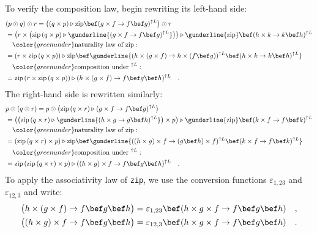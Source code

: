 To verify the composition law, begin rewriting its left-hand side:
\begin{align*}
 & (p\odot q)\odot r=\big((q\times p)\triangleright\text{zip}\bef(g\times f\rightarrow f\bef g)^{\uparrow L}\big)\odot r\\
 & =\big(r\times\big(\text{zip}\left(q\times p\right)\triangleright\gunderline{(g\times f\rightarrow f\bef g)^{\uparrow L}}\big)\big)\triangleright\gunderline{\text{zip}}\bef(h\times k\rightarrow k\bef h)^{\uparrow L}\\
 & \quad{\color{greenunder}\text{naturality law of }\text{zip}:}\quad\\
 & =(r\times\text{zip}\left(q\times p\right))\triangleright\text{zip}\bef\gunderline{(h\times(g\times f)\rightarrow h\times(f\bef g))^{\uparrow L}\bef(h\times k\rightarrow k\bef h)^{\uparrow L}}\\
 & \quad{\color{greenunder}\text{composition under }^{\uparrow L}:}\quad\\
 & =\text{zip}\left(r\times\text{zip}\left(q\times p\right)\right)\triangleright(h\times(g\times f)\rightarrow f\bef g\bef h)^{\uparrow L}\quad.
\end{align*}
The right-hand side is rewritten similarly:
\begin{align*}
 & p\odot(q\odot r)=p\odot\big(\text{zip}\left(q\times r\right)\triangleright(g\times f\rightarrow f\bef g)^{\uparrow L}\big)\\
 & =\big(\big(\text{zip}\left(q\times r\right)\triangleright\gunderline{(h\times g\rightarrow g\bef h)^{\uparrow L}}\big)\times p\big)\triangleright\gunderline{\text{zip}}\bef(k\times f\rightarrow f\bef k)^{\uparrow L}\\
 & \quad{\color{greenunder}\text{naturality law of }\text{zip}:}\quad\\
 & =(\text{zip}\left(q\times r\right)\times p)\triangleright\text{zip}\bef\gunderline{((h\times g)\times f\rightarrow(g\bef h)\times f)^{\uparrow L}\bef(k\times f\rightarrow f\bef k)^{\uparrow L}}\\
 & \quad{\color{greenunder}\text{composition under }^{\uparrow L}:}\quad\\
 & =\text{zip}\left(\text{zip}\left(q\times r\right)\times p\right)\triangleright((h\times g)\times f\rightarrow f\bef g\bef h)^{\uparrow L}\quad.
\end{align*}
To apply the associativity law of \lstinline!zip!, we use the conversion
functions $\varepsilon_{1,23}$ and $\varepsilon_{12,3}$ and write:
\begin{align*}
 & \big(h\times(g\times f)\rightarrow f\bef g\bef h\big)=\varepsilon_{1,23}\bef(h\times g\times f\rightarrow f\bef g\bef h)\quad,\\
 & \big((h\times g)\times f\rightarrow f\bef g\bef h\big)=\varepsilon_{12,3}\bef(h\times g\times f\rightarrow f\bef g\bef h)\quad.
\end{align*}
